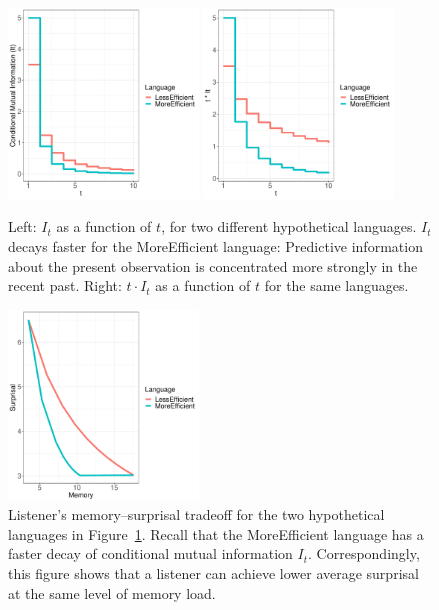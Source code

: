 \begin{figure}
\includegraphics[width=0.45\textwidth]{figures/decay.pdf}
\includegraphics[width=0.45\textwidth]{figures/memory.pdf}
%
	\caption{Left: $I_t$ as a function of $t$, for two different hypothetical languages. $I_t$ decays faster for the MoreEfficient language: Predictive information about the present observation is concentrated more strongly in the recent past. Right: $t \cdot I_t$ as a function of $t$ for the same languages. }\label{fig:basic}
\end{figure}

\begin{figure}
\includegraphics[width=0.45\textwidth]{figures/listener-tradeoff.pdf}
	\caption{Listener's memory--surprisal tradeoff for the two hypothetical languages in Figure~\ref{fig:basic}. Recall that the MoreEfficient language has a faster decay of conditional mutual information $I_t$. Correspondingly, this figure shows that a listener can achieve lower average surprisal at the same level of memory load.}\label{fig:listener-tradeoff}
\end{figure}

